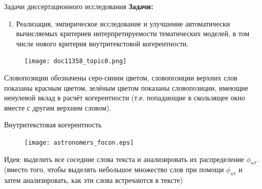 \begin{frame}[t]{Задачи диссертационного исследования}
\small
\textbf{Задачи:}
\begin{enumerate}
    \item Реализация, эмпирическое исследование и улучшение автоматически вычисляемых критериев интерпретируемости тематических моделей, в том числе нового критерия внутритекстовой когерентности.
\end{enumerate}

\begin{figure}
        \texttt{[image: doc11358\_topic0.png]} %
\end{figure}
\vspace{-7pt}
Словопозиции обозначены серо-синим цветом, словопозиции верхних слов показаны красным цветом, зелёным цветом показаны словопозиции, имеющие ненулевой вклад в расчёт когерентности (т.е. попадающие в скользящее окно вместе с другим верхним словом).
\normalsize

\end{frame}
\begin{frame}{Внутритекстовая когерентность}
\begin{figure}
   \centering
    \texttt{[image: astronomers\_focon.eps]} %
\end{figure}

Идея: выделить все соседние слова текста и анализировать их распределение $\phi_{wt}$.\\
\medskip
(вместо того, чтобы выделять небольшое множество слов при помощи $\phi_{wt}$ и затем анализировать, как эти слова встречаются в тексте)

\end{frame}



